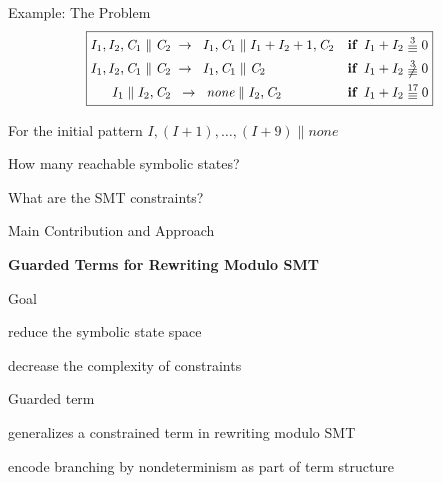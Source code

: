 \documentclass[11pt]{beamer}
\begin{document}
\begin{frame}{Example: The Problem}
\[
\scalebox{0.95}{
\boxed{
\begin{aligned}
I_1, I_2, \mathit{C}_1 \parallel \mathit{C}_2 &\;\rews \;\;I_1,\mathit{C}_1 \parallel I_1 + I_2 + 1, \mathit{C}_2  && \textbf{if} \;\;   I_1 + I_2 \;\raisebox{-0.5ex}{\ensuremath{\stackrel{3}{\equiv}}}\; 0 \\
I_1,I_2,\mathit{C}_1 \parallel \mathit{C}_2 &\;\rews\;\;I_1,\mathit{C}_1 \parallel \mathit{C}_2 \quad && \textbf{if} \;\;  I_1 + I_2 \;\raisebox{-0.5ex}{\ensuremath{\not\stackrel{3}{\equiv}}}\; 0 \\
I_1 \parallel I_2,\mathit{C}_2 &\;\;\rews\;\;\textit{none} \parallel I_2,\mathit{C}_2 \quad && \textbf{if}\;\; I_1 + I_2 \;\raisebox{-0.5ex}{\ensuremath{\stackrel{17}{\equiv}}}\; 0
\end{aligned}
}
}
\]

\begin{outeritemize}
    \item For the initial pattern $I, (I+1), \ldots, (I+9) \parallel \textit{none}$
    \item How many reachable symbolic states?
    \item What are the SMT constraints?
\end{outeritemize}
\end{frame}



\begin{frame}{Main Contribution and Approach}
\begin{center}\textbf{Guarded Terms for Rewriting Modulo SMT}\end{center}
\begin{outeritemize}
    \item Goal
    
    \begin{inneritemize}
        \item reduce the symbolic state space 
        \item decrease the complexity of constraints
    \end{inneritemize}
    
    \item Guarded term 
    
    \begin{inneritemize}
        \item generalizes a constrained term in rewriting modulo SMT 
        \item encode branching by nondeterminism as part of term structure
    \end{inneritemize}

\end{outeritemize}
\end{frame}
\end{document}
